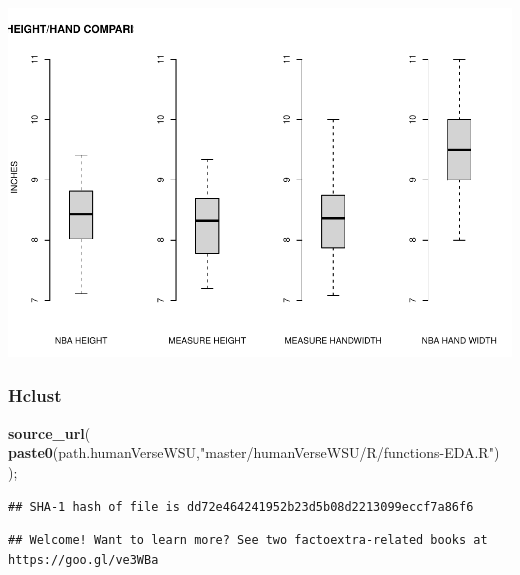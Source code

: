 \documentclass[]{article}
\newenvironment{Shaded}{\begin{snugshade}}{\end{snugshade}}
\newcommand{\KeywordTok}[1]{\textcolor[rgb]{0.13,0.29,0.53}{\textbf{#1}}}
\newcommand{\NormalTok}[1]{#1}
\newcommand{\OperatorTok}[1]{\textcolor[rgb]{0.81,0.36,0.00}{\textbf{#1}}}
\newcommand{\StringTok}[1]{\textcolor[rgb]{0.31,0.60,0.02}{#1}}
\begin{document}
\begin{Shaded}
\end{Shaded}

\includegraphics{project-measure-writeup_files/figure-latex/boxplots-hand/height-proportions-1.pdf}

\subsubsection{Hclust}
\label{sec:hclust}

\begin{Shaded}
\begin{Highlighting}[]
\KeywordTok{source\_url}\NormalTok{( }\KeywordTok{paste0}\NormalTok{(path.humanVerseWSU,}\StringTok{"master/humanVerseWSU/R/functions{-}EDA.R"}\NormalTok{) );}
\end{Highlighting}
\end{Shaded}

\begin{verbatim}
## SHA-1 hash of file is dd72e464241952b23d5b08d2213099eccf7a86f6
\end{verbatim}

\begin{verbatim}
## Welcome! Want to learn more? See two factoextra-related books at https://goo.gl/ve3WBa
\end{verbatim}
\end{document}
